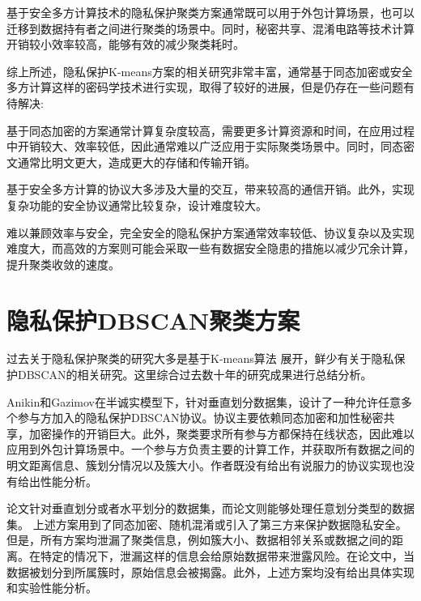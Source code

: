 基于安全多方计算技术的隐私保护聚类方案通常既可以用于外包计算场景，也可以迁移到数据持有者之间进行聚类的场景中。同时，秘密共享、混淆电路等技术计算开销较小效率较高，能够有效的减少聚类耗时。

综上所述，隐私保护K-means方案的相关研究非常丰富，通常基于同态加密或安全多方计算这样的密码学技术进行实现，取得了较好的进展，但是仍存在一些问题有待解决:
\begin{compactitem}
	\item 基于同态加密的方案通常计算复杂度较高，需要更多计算资源和时间，在应用过程中开销较大、效率较低，因此通常难以广泛应用于实际聚类场景中。同时，同态密文通常比明文更大，造成更大的存储和传输开销。
	\item 基于安全多方计算的协议大多涉及大量的交互，带来较高的通信开销。此外，实现复杂功能的安全协议通常比较复杂，设计难度较大。
	\item 难以兼顾效率与安全，完全安全的隐私保护方案通常效率较低、协议复杂以及实现难度大，而高效的方案则可能会采取一些有数据安全隐患的措施以减少冗余计算，提升聚类收敛的速度。
\end{compactitem}

\section{隐私保护DBSCAN聚类方案}
过去关于隐私保护聚类的研究大多是基于K-means算法  展开，鲜少有关于隐私保护DBSCAN的相关研究。这里综合过去数十年的研究成果进行总结分析。

Anikin和Gazimov\cite{anikin2017privacy}在半诚实模型下，针对垂直划分数据集，设计了一种允许任意多个参与方加入的隐私保护DBSCAN协议。协议主要依赖同态加密和加性秘密共享，加密操作的开销巨大。此外，聚类要求所有参与方都保持在线状态，因此难以应用到外包计算场景中。一个参与方负责主要的计算工作，并获取所有数据之间的明文距离信息、簇划分情况以及簇大小。作者既没有给出有说服力的协议实现也没有给出性能分析。

论文\cite{2006Privacy,jiang2008privacy,kumar2007privacy,liu2012privacy,xu2007protocols}针对垂直划分或者水平划分的数据集，而论文\cite{almutairi2018secure,liu2012privacy}则能够处理任意划分类型的数据集。
上述方案用到了同态加密、随机混淆或引入了第三方来保护数据隐私安全。但是，所有方案均泄漏了聚类信息，例如簇大小、数据相邻关系\cite{almutairi2018secure,jiang2008privacy,kumar2007privacy,liu2012privacy,rahman2017towards}或数据之间的距离\cite{2006Privacy}。在特定的情况下，泄漏这样的信息会给原始数据带来泄露风险\cite{kumar2007privacy,liu2012privacy}。在论文\cite{xu2007protocols}中，当数据被划分到所属簇时，原始信息会被揭露。此外，上述方案均没有给出具体实现和实验性能分析。

